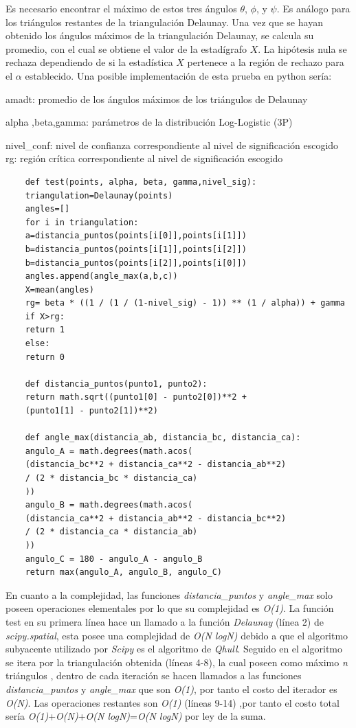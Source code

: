 \documentclass[12pt]{report}
\begin{document}
Es necesario encontrar el máximo de estos tres ángulos \(\theta\), \(\phi\), y \(\psi\). Es análogo para los triángulos restantes de la triangulación Delaunay. Una vez que se hayan obtenido los ángulos máximos de la triangulación Delaunay, se calcula su promedio, con el cual se obtiene el valor de la estadígrafo \(X\). La hipótesis nula se rechaza dependiendo de si la estadística \(X\) pertenece a la región de rechazo para el \(\alpha\) establecido. Una posible implementación de esta prueba en python sería:

amadt: promedio de los ángulos máximos de los triángulos de Delaunay

alpha ,beta,gamma: parámetros de la distribución Log-Logistic (3P)

nivel\_conf: nivel de confianza correspondiente al nivel de significación escogido
rg: región crítica correspondiente al nivel de significación escogido


\begin{lstlisting}
	def test(points, alpha, beta, gamma,nivel_sig):
	triangulation=Delaunay(points)
	angles=[]
	for i in triangulation:
	a=distancia_puntos(points[i[0]],points[i[1]])
	b=distancia_puntos(points[i[1]],points[i[2]])
	b=distancia_puntos(points[i[2]],points[i[0]])
	angles.append(angle_max(a,b,c))     
	X=mean(angles) 
	rg= beta * ((1 / (1 / (1-nivel_sig) - 1)) ** (1 / alpha)) + gamma
	if X>rg:
	return 1
	else:
	return 0
	
	def distancia_puntos(punto1, punto2):
	return math.sqrt((punto1[0] - punto2[0])**2 +
	(punto1[1] - punto2[1])**2)
	
	def angle_max(distancia_ab, distancia_bc, distancia_ca):
	angulo_A = math.degrees(math.acos(
	(distancia_bc**2 + distancia_ca**2 - distancia_ab**2) 
	/ (2 * distancia_bc * distancia_ca)
	))
	angulo_B = math.degrees(math.acos(
	(distancia_ca**2 + distancia_ab**2 - distancia_bc**2) 
	/ (2 * distancia_ca * distancia_ab)
	))
	angulo_C = 180 - angulo_A - angulo_B  
	return max(angulo_A, angulo_B, angulo_C)
\end{lstlisting}

En cuanto a la complejidad, las funciones \textit{distancia\_puntos} y \textit{angle\_max} solo poseen operaciones elementales por lo que su complejidad es \textit{O(1)}. La función test en su primera línea hace un llamado a la función  \textit{Delaunay} (línea 2) de \textit{scipy.spatial}, esta posee una complejidad de \textit{O(N logN)} debido a que el algoritmo subyacente utilizado por \textit{Scipy} es el algoritmo de \textit{Qhull}. Seguido en el algoritmo se itera por la triangulación obtenida (líneas 4-8), la cual poseen como máximo \textit{n} triángulos , dentro de cada iteración se hacen llamados a las  funciones \textit{distancia\_puntos} y \textit{angle\_max}  que son \textit{O(1)}, por tanto el costo del iterador es \textit{O(N)}. Las operaciones restantes son \textit{O(1)} (líneas 9-14) ,por tanto el costo total sería \textit{O(1)}+\textit{O(N)}+\textit{O(N logN)}=\textit{O(N logN)} por ley de la suma.
\end{document}
